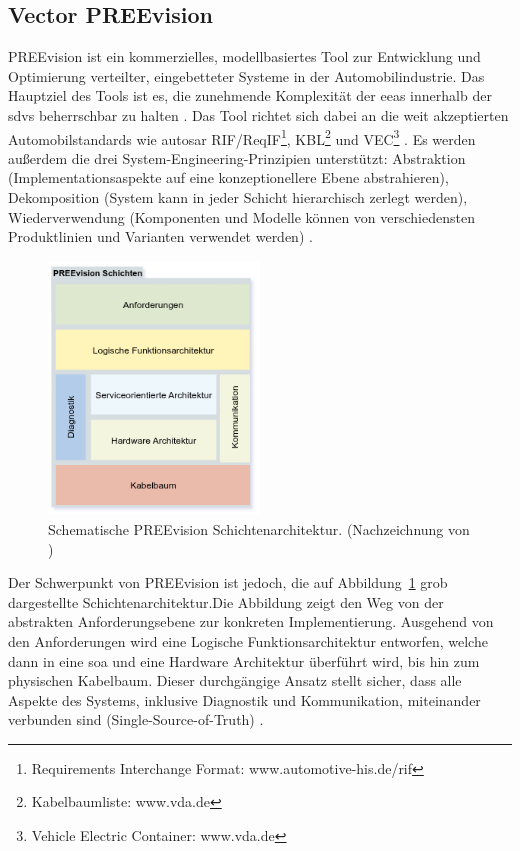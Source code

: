 \subsection{Vector PREEvision}
PREEvision ist ein kommerzielles, modellbasiertes Tool zur Entwicklung und Optimierung verteilter, eingebetteter Systeme in der Automobilindustrie. Das Hauptziel des Tools ist es, die zunehmende Komplexität der \glspl{eea} innerhalb der \glspl{sdv} beherrschbar zu halten \cite{askaripoor2022architecture}. Das  Tool richtet sich dabei an die weit akzeptierten Automobilstandards wie \gls{autosar} RIF/ReqIF\footnote{Requirements Interchange Format: www.automotive-his.de/rif}, KBL\footnote{Kabelbaumliste: www.vda.de
} und VEC\footnote{Vehicle Electric Container: www.vda.de} \cite{schauffele2016architectural}. Es werden außerdem die drei System-Engineering-Prinzipien unterstützt: Abstraktion (Implementationsaspekte auf eine konzeptionellere Ebene abstrahieren), Dekomposition (System kann in jeder Schicht hierarchisch zerlegt werden), Wiederverwendung (Komponenten und Modelle können von verschiedensten Produktlinien und Varianten verwendet werden) \cite{schauffele2016architectural}.

\begin{figure}[h!]
  \centering
  \includegraphics[width=0.5\textwidth]{figures/PREEVISION_LAYER.drawio.png}
  \caption{Schematische PREEvision Schichtenarchitektur. (Nachzeichnung von \cite{Vec23})}
  \label{fig:preevision_schicht}
\end{figure}

Der Schwerpunkt von PREEvision ist jedoch, die auf Abbildung~\ref{fig:preevision_schicht} grob dargestellte Schichtenarchitektur.Die Abbildung zeigt den Weg von der abstrakten Anforderungsebene zur konkreten Implementierung. Ausgehend von den Anforderungen wird eine Logische Funktionsarchitektur entworfen, welche dann in eine \gls{soa} und eine Hardware Architektur überführt wird, bis hin zum physischen Kabelbaum. Dieser durchgängige Ansatz stellt sicher, dass alle Aspekte des Systems, inklusive Diagnostik und Kommunikation, miteinander verbunden sind (Single-Source-of-Truth) \cite{schauffele2016architectural}.


